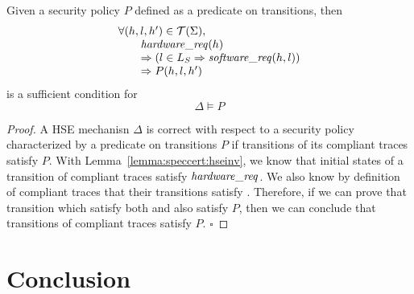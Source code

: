 \begin{theorem}
  \label{theorem:speccert:correcthse}
  Given a security policy $P$ defined as a predicate on transitions, then
  \[
    \begin{array}{l}
      \forall (h, l, h') \in \mathcal{T}(\Sigma), \\
      \qquad \mathit{hardware\_req}(h) \\
      \qquad \Rightarrow (l \in L_{S} \Rightarrow \mathit{software\_req}(h, l))\\
      \qquad \Rightarrow P(h, l, h')
    \end{array}
  \]
  is a sufficient condition for
  \[
    \Delta \models P
  \]

  \begin{proof}
    A HSE mechanisn \( \Delta \) is correct with respect to a security policy
    characterized by a predicate on transitions \( P \) if transitions of its
    compliant traces satisfy \( P \).
    With Lemma~\ref{lemma:speccert:hseinv}, we know that initial states of a
    transition of compliant traces satisfy $\mathit{hardware\_req}$.
    We also know by definition of compliant traces that their transitions
    satisfy .
    Therefore, if we can prove that transition which satisfy both
     and  also satisfy \( P \), then we
    can conclude that transitions of compliant traces satisfy \( P \).
    \hfill \( \square \)
  \end{proof}
\end{theorem}


\section{Conclusion}

